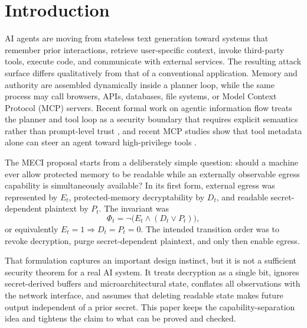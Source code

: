 \documentclass[11pt,letterpaper]{article}
\theoremstyle{plain}
\theoremstyle{definition}
\begin{document}
\section{Introduction}

AI agents are moving from stateless text generation toward systems that remember prior interactions, retrieve user-specific context, invoke third-party tools, execute code, and communicate with external services. The resulting attack surface differs qualitatively from that of a conventional application. Memory and authority are assembled dynamically inside a planner loop, while the same process may call browsers, APIs, databases, file systems, or Model Context Protocol (MCP) servers. Recent formal work on agentic information flow treats the planner and tool loop as a security boundary that requires explicit semantics rather than prompt-level trust \cite{llmbda}, and recent MCP studies show that tool metadata alone can steer an agent toward high-privilege tools \cite{mcpitp,mcpshield}.

The MECI proposal starts from a deliberately simple question: should a machine ever allow protected memory to be readable while an externally observable egress capability is simultaneously available? In its first form, external egress was represented by $E_t$, protected-memory decryptability by $D_t$, and readable secret-dependent plaintext by $P_t$. The invariant was
\begin{equation}\label{eq:orig}
\Phi_t = \neg\big(E_t \wedge (D_t \vee P_t)\big),
\end{equation}
or equivalently $E_t = 1 \Rightarrow D_t = P_t = 0$. The intended transition order was to revoke decryption, purge secret-dependent plaintext, and only then enable egress.

That formulation captures an important design instinct, but it is not a sufficient security theorem for a real AI system. It treats decryption as a single bit, ignores secret-derived buffers and microarchitectural state, conflates all observations with the network interface, and assumes that deleting readable state makes future output independent of a prior secret. This paper keeps the capability-separation idea and tightens the claim to what can be proved and checked.
\end{document}
